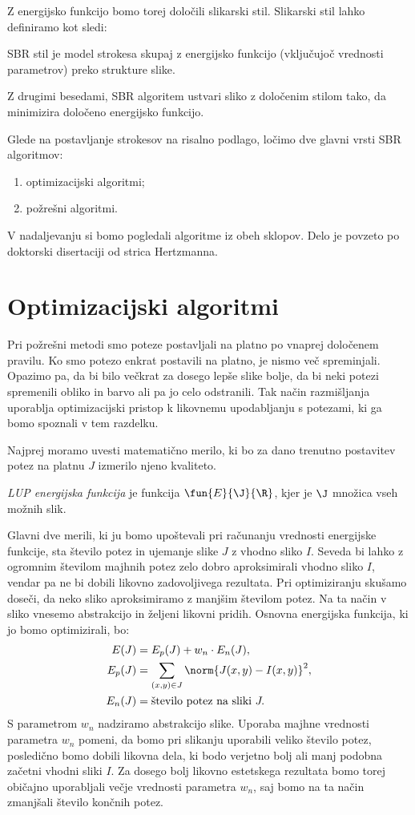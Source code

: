 Z energijsko funkcijo bomo torej določili slikarski stil. Slikarski stil lahko definiramo kot sledi:
%
\begin{definicija}
SBR stil je model strokesa skupaj z energijsko funkcijo (vključujoč vrednosti parametrov) preko strukture slike.
\end{definicija}
%
Z drugimi besedami, SBR algoritem ustvari sliko z določenim stilom tako, da minimizira določeno energijsko funkcijo.

Glede na postavljanje strokesov na risalno podlago, ločimo dve glavni vrsti SBR algoritmov:
%
\begin{enumerate}
\item optimizacijski algoritmi;
\item požrešni algoritmi.
\end{enumerate}
%
V nadaljevanju si bomo pogledali algoritme iz obeh sklopov. Delo je povzeto po doktorski disertaciji od strica Hertzmanna.
\section{Optimizacijski algoritmi}
%
Pri požrešni metodi smo poteze postavljali na platno po vnaprej določenem pravilu. Ko smo potezo enkrat postavili na platno, je nismo več spreminjali. Opazimo pa, da bi bilo večkrat za dosego lepše slike bolje, da bi neki potezi spremenili obliko in barvo ali pa jo celo odstranili. Tak način razmišljanja uporablja optimizacijski pristop k likovnemu upodabljanju s potezami, ki ga bomo spoznali v tem razdelku.

Najprej moramo uvesti matematično merilo, ki bo za dano trenutno postavitev potez na platnu $J$ izmerilo njeno kvaliteto.
%
\begin{definicija}
\emph{LUP energijska funkcija} je funkcija $\fun{E}{\J}{\R}$, kjer je $\J$ množica vseh možnih slik.
\end{definicija}
%
Glavni dve merili, ki ju bomo upoštevali pri računanju vrednosti energijske funkcije, sta število potez in ujemanje slike $J$ z vhodno sliko $I$. Seveda bi lahko z ogromnim številom majhnih potez zelo dobro aproksimirali vhodno sliko $I$, vendar pa ne bi dobili likovno zadovoljivega rezultata. Pri optimiziranju skušamo doseči, da neko sliko aproksimiramo z manjšim številom potez. Na ta način v sliko vnesemo abstrakcijo in željeni likovni pridih. Osnovna energijska funkcija, ki jo bomo optimizirali, bo:
%
\begin{align*}
E(J) & = E_p(J) + w_n \cdot E_n(J), \\
E_p(J) & = \sum_{(x, y) \in J} \norm{J(x, y) - I(x, y)}^2, \\
E_n(J) & = \textup{število potez na sliki }J.
\end{align*}
%
S parametrom $w_n$ nadziramo abstrakcijo slike. Uporaba majhne vrednosti parametra $w_n$ pomeni, da bomo pri slikanju uporabili veliko število potez, posledično bomo dobili likovna dela, ki bodo verjetno bolj ali manj podobna začetni vhodni sliki $I$. Za dosego bolj likovno estetskega rezultata bomo torej običajno uporabljali večje vrednosti parametra $w_n$, saj bomo na ta način zmanjšali število končnih potez.

